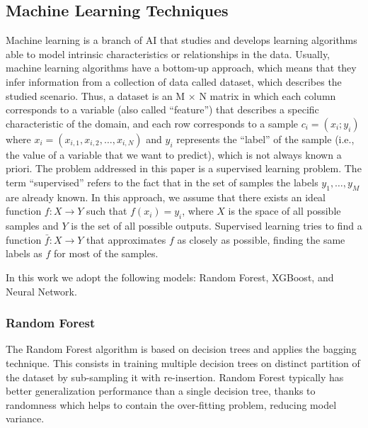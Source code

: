 \documentclass[review]{elsarticle}
\begin{document}
\subsection{Machine Learning Techniques}
Machine learning is a branch of AI that studies and develops learning algorithms able to model intrinsic characteristics or relationships in the data. %
Usually, machine learning algorithms have a bottom-up approach, which means that they infer information from a collection of data called dataset, which describes the studied scenario. Thus, a dataset is an M $ \times $ N matrix in which each column corresponds to a variable (also called “feature”) that describes a specific characteristic of the domain, and each row corresponds to a sample $c_{i}= (x_{i};y_{i})$ where $x_{i}= (x_{i, 1}, x_{i, 2},\ldots, x_{i, N } )$ and $y_{i} $ represents the “label” of the sample (i.e., the value of a variable that we want to predict), which is not always known a priori. The problem addressed in this paper is a supervised learning problem. The term “supervised” refers to the fact that in the set of samples the labels $y_{1}, \ldots, y_{M}$ are already known. In this approach, we assume that there exists an ideal function $ f: X \rightarrow Y $ such that $ f(x_{i}) = y_{i} $, where $ X $ is the space of all possible samples and $ Y $ is the set of all possible outputs. Supervised learning tries to find a function $ \bar {f}: X \rightarrow Y $ that approximates $ f $ as closely as possible, finding the same labels as $ f $ for most of the samples.

In this work we adopt the following models:
Random Forest, XGBoost, and Neural Network. 

\subsubsection{Random Forest}
The Random Forest algorithm \cite{breiman2001random} is based on decision trees and applies the bagging technique. This consists in training multiple decision trees on distinct partition of the dataset by sub-sampling it with re-insertion. %
Random Forest typically has better generalization performance than a single decision tree, thanks to randomness which helps to contain the over-fitting problem, reducing model variance.
\end{document}
